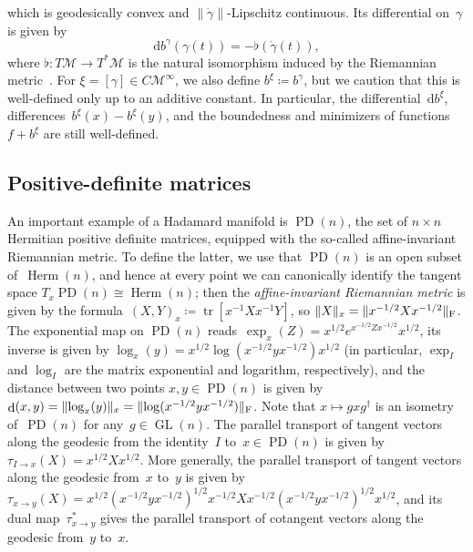 \documentclass[11pt,letterpaper]{article}
\numberwithin{equation}{section}
\newcommand{\diff}{\mathrm{d}}
\newcommand{\MM}{\mathcal{M}}
\DeclareMathOperator{\PD}{PD}
\DeclareMathOperator{\dist}{d}
\DeclareMathOperator{\GL}{GL}
\DeclareMathOperator{\tr}{tr}
\DeclareMathOperator{\Herm}{Herm}
\DeclarePairedDelimiter\norm{\lVert}{\rVert}
\begin{document}
which is geodesically convex and $\|\dot\gamma\|$-Lipschitz continuous.
Its differential on~$\gamma$ is given by
\begin{equation}\label{eq:diff busemann}
    \diff b^\gamma(\gamma(t)) = -\flat(\dot \gamma(t)),
\end{equation}
where $\flat \colon T\MM \to T^*\MM$ is the natural isomorphism induced by the Riemannian metric~\cite[Prop.~3.1]{HeintzeImHof1977}.
For $\xi = [\gamma] \in C\MM^\infty$, we also define $b^\xi \coloneqq b^\gamma$, but we caution that this is well-defined only up to an additive constant.
In particular, the differential~$\diff b^\xi$, differences~$b^\xi(x) - b^\xi(y)$, and the boundedness and minimizers of functions~$f + b^\xi$ are still well-defined.

\subsection{Positive-definite matrices}\label{sub:pd}
An important example of a Hadamard manifold is $\PD(n)$, the set of $n\times n$ Hermitian positive definite matrices, equipped with the so-called affine-invariant Riemannian metric.
To define the latter, we use that $\PD(n)$ is an open subset of~$\Herm(n)$, and hence at every point we can canonically identify the tangent space $T_x \PD(n) \cong \Herm(n)$; then the \emph{affine-invariant Riemannian metric} is given by the formula~$(X,Y)_x \coloneqq \tr[x^{-1} X x^{-1} Y]$, so $\norm{X}_x = \norm{x^{-1/2} X x^{-1/2}}_{\mathrm{F}}$.
The exponential map on $\PD(n)$ reads~$\exp_x(Z) = x^{1/2} e^{x^{-1/2} Z x^{-1/2}} x^{1/2}$, its inverse is given by $\log_x(y) = x^{1/2} \log(x^{-1/2} y x^{-1/2}) x^{1/2}$ (in particular, $\exp_I$ and $\log_I$ are the matrix exponential and logarithm, respectively), and the distance between two points $x,y\in\PD(n)$ is given by $\dist(x, y) = \norm{\log_x(y)}_x = \norm{\log(x^{-1/2} y x^{-1/2})}_{\mathrm{F}}$.
Note that $x \mapsto gxg^\dagger$ is an isometry of~$\PD(n)$ for any~$g \in \GL(n)$.
The parallel transport of tangent vectors along the geodesic from the identity~$I$ to~$x \in \PD(n)$ is given by~$\tau_{I\to x}(X) = x^{1/2} X x^{1/2}$.
More generally, the parallel transport of tangent vectors along the geodesic from~$x$ to~$y$ is given by $\tau_{x\to y}(X) = x^{1/2} (x^{-1/2} y x^{-1/2})^{1/2} x^{-1/2} X x^{-1/2} (x^{-1/2} y x^{-1/2})^{1/2} x^{1/2}$, and its dual map~$\tau_{x\to y}^*$ gives the parallel transport of cotangent vectors along the geodesic from~$y$ to~$x$.
\end{document}
